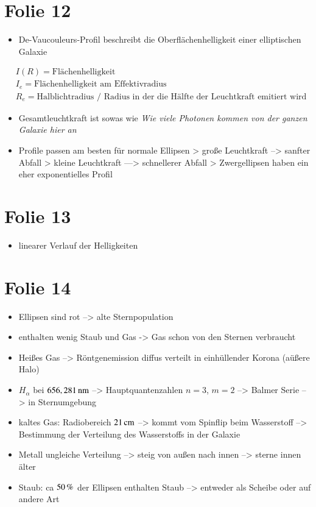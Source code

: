 \section{Folie 12}

\begin{itemize}
\item De-Vaucouleurs-Profil beschreibt die Oberflächenhelligkeit einer elliptischen Galaxie
\end{itemize}

\begin{align*}
&I(R) = \text{Flächenhelligkeit} \\
&I_e = \text{Flächenhelligkeit am Effektivradius} \\
&R_e = \text{Halblichtradius / Radius in der die Hälfte der Leuchtkraft emitiert wird}
\end{align*}


\begin{itemize}
\item Gesamtleuchtkraft ist sowas wie \textit{Wie viele Photonen kommen von der ganzen Galaxie hier an}
\item Profile passen am besten für normale Ellipsen
\subitem > große Leuchtkraft --> sanfter Abfall
\subitem > kleine Leuchtkraft ---> schnellerer Abfall
\subitem > Zwergellipsen haben ein eher exponentielles Profil
\end{itemize}


\section{Folie 13}


\begin{itemize}
\item linearer Verlauf der Helligkeiten 
\end{itemize}


\section{Folie 14}

\begin{itemize}
\item Ellipsen sind rot --> alte Sternpopulation
\item enthalten wenig Staub und Gas -> Gas schon von den Sternen verbraucht
\item Heißes Gas --> Röntgenemission diffus verteilt in einhüllender Korona (aüßere Halo)
\item $H_\alpha$ bei $\unit[656,281]{nm}$ -->  Hauptquantenzahlen $n=3$, $m=2$ --> Balmer Serie --> in Sternumgebung
\item kaltes Gas: Radiobereich $\unit[21]{cm}$ --> kommt vom Spinflip beim Wasserstoff --> Bestimmung der Verteilung des Wasserstoffs in der Galaxie
\item Metall ungleiche Verteilung --> steig von außen nach innen --> sterne innen älter
\item Staub: ca $\unit[50]{\%}$ der Ellipsen enthalten Staub --> entweder als Scheibe oder auf andere Art
\end{itemize}


